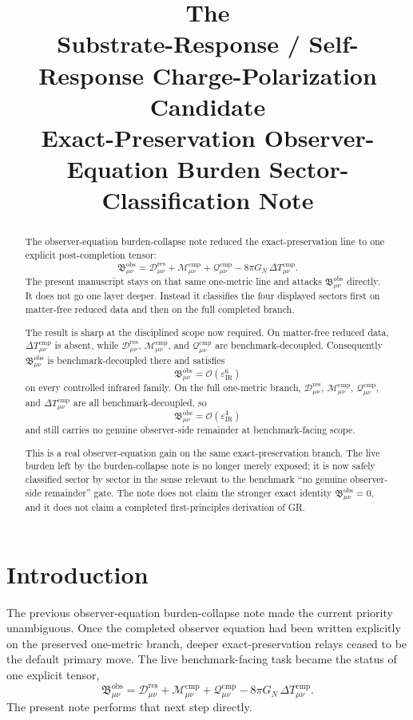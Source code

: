 \documentclass[11pt]{article}
\title{\textbf{The \TheoryName{}}\\[0.4em]
\large Substrate-Response / Self-Response Charge-Polarization Candidate\\
\large Exact-Preservation Observer-Equation Burden Sector-Classification Note}
\author{}
\date{}
\newcommand{\ResidualDec}{\mathcal D_{\mu\nu}^{\mathrm{res}}}
\newcommand{\CompMix}{\mathcal M_{\mu\nu}^{\mathrm{cmp}}}
\newcommand{\CompQuad}{\mathcal Q_{\mu\nu}^{\mathrm{cmp}}}
\newcommand{\DeltaTComp}{\Delta T_{\mu\nu}^{\mathrm{cmp}}}
\newcommand{\ObsBurden}{\mathfrak B_{\mu\nu}^{\mathrm{obs}}}
\newcommand{\epsIR}{\varepsilon_{\mathrm{IR}}}
\begin{document}
\maketitle

\begin{abstract}
The observer-equation burden-collapse note reduced the exact-preservation line to one explicit post-completion tensor:
\[
\ObsBurden
=
\ResidualDec+\CompMix+\CompQuad-8\pi G_N\,\DeltaTComp.
\]
The present manuscript stays on that same one-metric line and attacks \(\ObsBurden\) directly. It does not go one layer deeper. Instead it classifies the four displayed sectors first on matter-free reduced data and then on the full completed branch.

The result is sharp at the disciplined scope now required. On matter-free reduced data, \(\DeltaTComp\) is absent, while \(\ResidualDec\), \(\CompMix\), and \(\CompQuad\) are benchmark-decoupled. Consequently \(\ObsBurden\) is benchmark-decoupled there and satisfies
\[
\ObsBurden=\mathcal O(\epsIR^6)
\]
on every controlled infrared family. On the full one-metric branch, \(\ResidualDec\), \(\CompMix\), \(\CompQuad\), and \(\DeltaTComp\) are all benchmark-decoupled, so
\[
\ObsBurden=\mathcal O(\epsIR^4)
\]
and still carries no genuine observer-side remainder at benchmark-facing scope.

This is a real observer-equation gain on the same exact-preservation branch. The live burden left by the burden-collapse note is no longer merely exposed; it is now safely classified sector by sector in the sense relevant to the benchmark ``no genuine observer-side remainder'' gate. The note does not claim the stronger exact identity \(\ObsBurden=0\), and it does not claim a completed first-principles derivation of GR.
\end{abstract}

\section{Introduction}

The previous observer-equation burden-collapse note made the current priority unambiguous. Once the completed observer equation had been written explicitly on the preserved one-metric branch, deeper exact-preservation relays ceased to be the default primary move. The live benchmark-facing task became the status of one explicit tensor,
\[
\ObsBurden
=
\ResidualDec+\CompMix+\CompQuad-8\pi G_N\,\DeltaTComp.
\]
The present note performs that next step directly.
\end{document}
